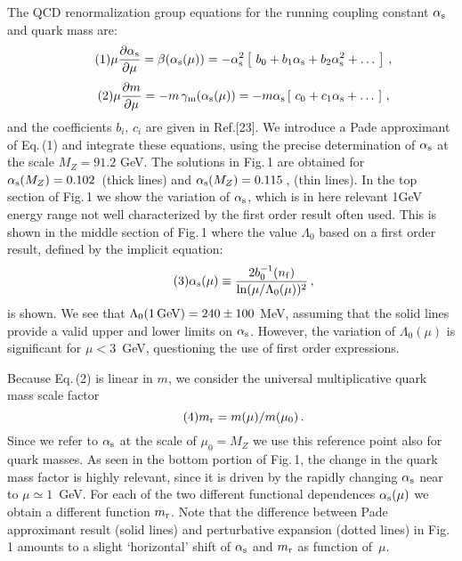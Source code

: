 \begin{mdframed}[linecolor=gray,roundcorner=12pt,backgroundcolor=Dandelion!15,linewidth=1pt,leftmargin=0cm,rightmargin=0cm,topline=true,bottomline=true,skipabove=12pt]
The QCD renormalization group equations for the running coupling constant $\alpha_{\rm s}$ and quark mass are:
\begin{equation}%
\tag{1}
\mu \frac{\partial\alpha_{\rm s}}{\partial\mu}
=\beta(\alpha_{\rm s}(\mu))=-\alpha_{\rm s}^2\left[\ b_0
   +b_1\alpha_{\rm s} +b_2\alpha_{\rm s}^2 +\ldots\ \right] 
\,,
\end{equation}
\begin{equation}%
\tag{2}
\mu {\frac{\partial m}{\partial\mu}} =-m\,
\gamma_{\rm m}(\alpha_{\rm s}(\mu))=-m\alpha_{\rm s}\left[\ c_0
+c_1\alpha_{\rm s} + \ldots\ \right]
\,,
\end{equation} 
and the coefficients $b_i,\,c_i$ are given in Ref.[23]. We introduce a Pade approximant of Eq.\,(1) and integrate these equations, using the precise determination of $\alpha_{\rm s}$ at the scale $M_Z=91.2$ GeV. The solutions in Fig.\,1 are obtained for $\alpha_{\rm s}(M_Z)=0.102$\, (thick lines) and $\alpha_{\rm s}(M_Z)=0.115$\,, (thin lines). In the top section of Fig.\,1 we show the variation of $\alpha_{\rm s}$, which is in here relevant 1GeV energy range not well characterized by the first order result often used. This is shown in the middle section of Fig.\,1 where the value $\Lambda_0$ based on a first order result, defined by the implicit equation:
\begin{equation} 
\tag{3}
\alpha_{\rm s}(\mu)\equiv\frac{2b_0^{-1}
(n_{\rm f})}{\ln(\mu/\Lambda_0(\mu))^2}\,,
\end{equation} 
is shown. We see that $\Lambda_0(1\mbox{\,GeV})=240\pm100$ MeV, assuming that the solid lines provide a valid upper and lower limits on $\alpha_{\rm s}$. However, the variation of $\Lambda_0(\mu)$ is significant for $\mu<3$~GeV, questioning the use of first order expressions. 
 
Because  Eq.\,(2) is linear in $m$, we consider the universal multiplicative quark mass scale factor
\begin{equation}  
\tag{4}
\hfill m_{\rm r}=m(\mu)/m(\mu_0)\,.
\end{equation}
Since we refer to  $\alpha_{\rm s}$ at the scale of $\mu_0= M_Z$  we use this reference point also for quark masses. As seen in the bottom portion of Fig.\,1, the change in the quark mass factor is highly relevant, since it is driven by the rapidly changing $\alpha_{\rm s}$ near to $\mu\simeq 1$~GeV. For each of the two different functional dependences $\alpha_{\rm s}(\mu)$ we obtain a different function $m_{\rm r}$. Note that the difference between Pade approximant result (solid lines) and perturbative expansion (dotted lines) in Fig.\,1 amounts to a slight `horizontal' shift of $\alpha_{\rm s}$ and $m_{\rm r}$ as function of~$\mu$.
 

\end{mdframed}
